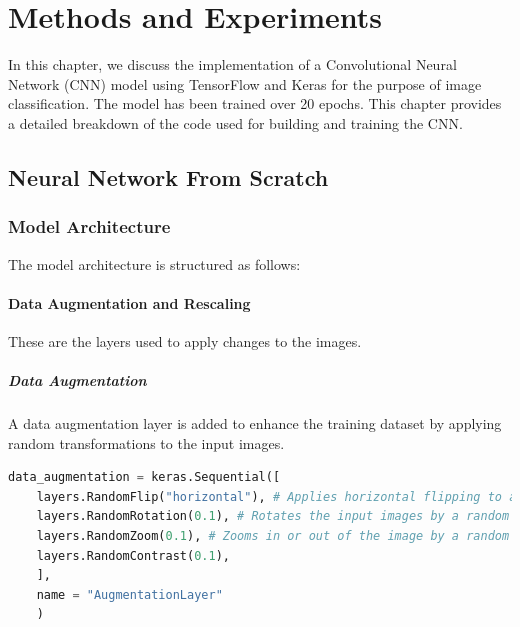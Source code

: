 \chapter{Methods and Experiments}

In this chapter, we discuss the implementation of a Convolutional Neural Network (CNN) model using TensorFlow 
and Keras for the purpose of image classification. The model has been trained over 20 epochs. This chapter provides 
a detailed breakdown of the code used for building and training the CNN.

\section{Neural Network From Scratch}

\subsection{Model Architecture}

The model architecture is structured as follows:

\subsubsection{Data Augmentation and Rescaling}
These are the layers used to apply changes to the images.

\paragraph{Data Augmentation}
A data augmentation layer is added to enhance the training dataset by applying random transformations to the input images.

\begin{lstlisting}[language=Python]
	data_augmentation = keras.Sequential([
	layers.RandomFlip("horizontal"), # Applies horizontal flipping to a random 50% of the images
	layers.RandomRotation(0.1), # Rotates the input images by a random value in the range[-10\%, +10\%] (fraction of full circle [-36, 36])
	layers.RandomZoom(0.1), # Zooms in or out of the image by a random factor in the range [-20%, +20%]
	layers.RandomContrast(0.1),
	],
	name = "AugmentationLayer"
	)
\end{lstlisting}

